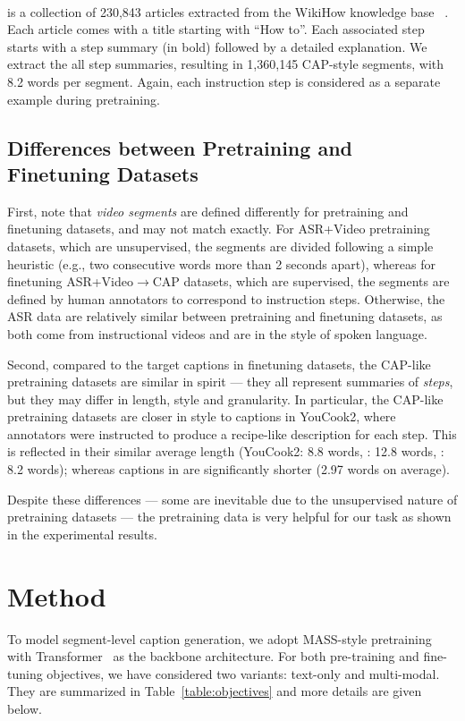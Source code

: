 \documentclass[11pt,a4paper]{article}
\begin{document}
\paragraph{\wikihow} is a collection of 230,843 articles extracted from the WikiHow knowledge base ~\citep{koupaee2018wikihow}. Each article comes with a title starting with ``How to''.  Each associated step starts with a step summary (in bold) followed by a detailed explanation. 
We extract the all step summaries, resulting in 1,360,145 CAP-style segments, with 8.2 words per segment.
Again, each instruction step is considered as a separate example during pretraining.


\subsection{Differences between Pretraining and Finetuning Datasets}

First, note that \textit{video segments} are defined differently for pretraining and finetuning datasets, and may not match exactly. For ASR+Video pretraining datasets, which are unsupervised, the segments are divided following a simple heuristic (e.g., two consecutive words more than 2 seconds apart), whereas for finetuning ASR+Video$\rightarrow$CAP datasets, which are supervised, the segments are defined by human annotators to correspond to instruction steps. 
Otherwise, the ASR data are relatively similar between pretraining and finetuning datasets, as both come from instructional videos and are in the style of spoken language.

Second, compared to the target captions in finetuning datasets, the CAP-like pretraining datasets are similar in spirit --- they all represent summaries of \textit{steps}, but they may differ in length, style and granularity.
In particular, the CAP-like pretraining datasets are closer in style to captions in YouCook2, where annotators were instructed to produce a recipe-like description for each step.  This is reflected in their similar average length (YouCook2: 8.8 words, \recipes: 12.8 words, \wikihow: 8.2 words); whereas captions in \ldvm are significantly shorter (2.97 words on average).


Despite these differences --- some are inevitable due to the unsupervised nature of pretraining datasets --- the pretraining data is very helpful for our task as shown in the experimental results.




 
\section{Method}
\label{sec:model}
To model segment-level caption generation, we adopt MASS-style pretraining~\cite{song2019mass} with Transformer~\cite{vaswani2017attention} as the backbone architecture. For both pre-training and fine-tuning objectives, we have considered two variants: text-only 
and multi-modal.
They are summarized in Table~\ref{table:objectives} and more details are given below.
\end{document}
